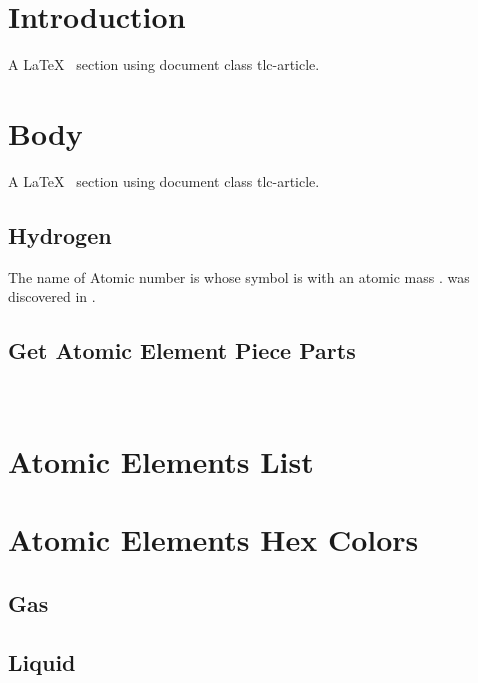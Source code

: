 \documentclass[12pt]{tlc-article}
\begin{document}

\section{Introduction}\label{sec:introduction}
A \LaTeX\   section using document class tlc-article.

\section{Body}\label{sec:body}
A \LaTeX\   section using document class tlc-article.

\subsection{Hydrogen}
The name of Atomic number  is  whose symbol is
 with an atomic mass .   was
discovered in .

\subsection{Get Atomic Element Piece Parts}
\
\
\
\
\
\
\
\
\
\
\
\
\
\

\section{Atomic Elements List}\label{sec:atomic01}
\aeYearDiscovered

\section{Atomic Elements Hex Colors}\label{sec:atomic02}
\subsection{Gas}

\subsection{Liquid}
\end{document}
